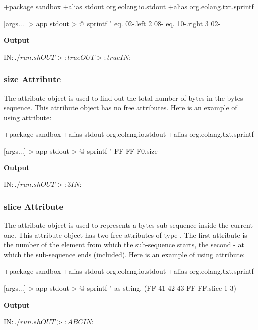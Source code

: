 \documentclass[12pt]{book}
\begin{document}
{\begin{ffcode}
+package sandbox
+alias stdout org.eolang.io.stdout
+alias org.eolang.txt.sprintf

[args...] > app
  stdout > @
    sprintf
      "%
      eq.
        02-.left 2
        08-
      eq.
        10-.right 3
        02-
\end{ffcode}
\textbf{Output}
\begin{ffcode}
IN$: ./run.sh
OUT>: true
OUT>: true
IN$:
\end{ffcode}

\subsubsection{size Attribute}
The  attribute object is used to find out the total number of bytes in the bytes sequence. This attribute object has no free attributes. Here is an example of using  attribute:

\begin{ffcode}
+package sandbox
+alias stdout org.eolang.io.stdout
+alias org.eolang.txt.sprintf

[args...] > app
  stdout > @
    sprintf
      "%
      FF-FF-F0.size
\end{ffcode}
\textbf{Output}
\begin{ffcode}
IN$: ./run.sh
OUT>: 3
IN$:
\end{ffcode}

\subsubsection{slice Attribute}
The  attribute object is used to represents a bytes sub-sequence inside the current one. This attribute object has two free attributes of type . The first attribute is the number of the element from which the sub-sequence starts, the second - at which the sub-sequence ends (included). Here is an example of using  attribute:

\begin{ffcode}
+package sandbox
+alias stdout org.eolang.io.stdout
+alias org.eolang.txt.sprintf

[args...] > app
  stdout > @
    sprintf
      "%
      as-string.
        (FF-41-42-43-FF-FF.slice 1 3)
\end{ffcode}
\textbf{Output}
\begin{ffcode}
IN$: ./run.sh
OUT>: ABC
IN$:
\end{ffcode}

}
\end{document}
